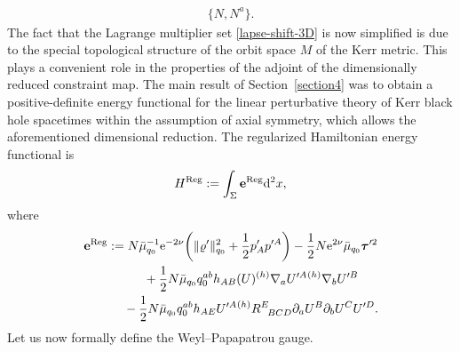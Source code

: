 \documentclass[11pt]{article}
\numberwithin{equation}{section}
\def\ptl{\partial}%
\def\mbo#1{\boldsymbol{#1}}%
\def\grad{{\nabla}}%
\newcommand{\leftexp}[2]{{\vphantom{#2}}^{#1}{#2}}
\def\halb{\frac{1}{2}}%
\numberwithin{equation}{section}
\begin{document}
	\begin{align} \label{lapse-shift-3D}
	\{ N, N^a \}.
	\end{align}
	The fact that the Lagrange multiplier set \eqref{lapse-shift-3D} is now simplified is due to the special topological
	structure of the orbit space $M$ of the Kerr metric. This plays a convenient role in the properties of the adjoint of the dimensionally reduced constraint map.
	The main result of Section~\ref{section4} was to obtain a positive-definite energy functional for the linear perturbative theory of Kerr black hole spacetimes within the assumption of axial symmetry, which allows the aforementioned dimensional reduction. The regularized Hamiltonian energy functional is
\begin{align*}
	H^{{\rm Reg}} := \int_{\Sigma} \mathbf{e}^{{\rm Reg}} {\rm d}^2x,
	\end{align*}
where
	\begin{gather*}
	\mathbf{e}^{{\rm Reg}} := N \bar{\mu}^{-1}_{q_0} {\rm e}^{-2 \nu} \biggl(\Vert \varrho' \Vert_{q_0}^2 + \halb p'_A p'^A\biggr) - \halb N {\rm e}^{2 \nu} \bar{\mu}_{q_0} \mbo{\tau}'^2 \notag\\
	\hphantom{\mathbf{e}^{{\rm Reg}} :=}{}+ \halb N \bar{\mu}_{q_0} q^{ab}_0 h_{AB}(U) \leftexp{(h)}{\grad}_a U'^A \leftexp{(h)}{\grad}_b U'^B \notag\\
	\hphantom{\mathbf{e}^{{\rm Reg}} :=}{}- \halb N \bar{\mu}_{q_0} q_0^{ab} h_{AE} U'^A \leftexp{(h)}{R}^E_{\,\,\,\, BCD} \ptl_a U^B \ptl_b U^C U'^D.
	\end{gather*}
	Let us now formally define the Weyl--Papapatrou gauge.
\end{document}
